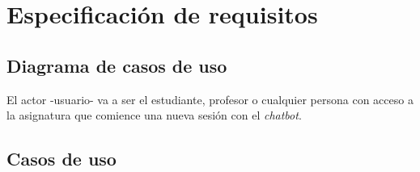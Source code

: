 \newpage
\section{Especificación de requisitos}

\subsection{Diagrama de casos de uso}

El actor -usuario- va a ser el estudiante, profesor o cualquier persona con acceso a la asignatura que comience una nueva sesión con el \textit{chatbot}.

\newpage

\subsection{Casos de uso}

